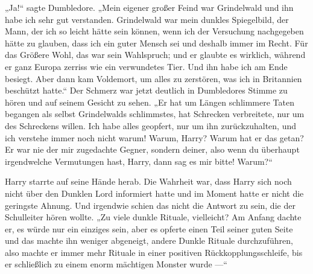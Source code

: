 „Ja!“ sagte Dumbledore.
„Mein eigener großer Feind war Grindelwald und ihn habe ich sehr gut verstanden. Grindelwald war mein dunkles Spiegelbild, der Mann, der ich so leicht hätte sein können, wenn ich der Versuchung nachgegeben hätte zu glauben, dass ich ein guter Mensch sei und deshalb immer im Recht. Für das Größere Wohl, das war sein Wahlspruch; und er glaubte es wirklich, während er ganz Europa zerriss wie ein verwundetes Tier. Und ihn habe ich am Ende besiegt. Aber dann kam Voldemort, um alles zu zerstören, was ich in Britannien beschützt hatte.“ Der Schmerz war jetzt deutlich in Dumbledores Stimme zu hören und auf seinem Gesicht zu sehen.
„Er hat um Längen schlimmere Taten begangen als selbst Grindelwalds schlimmstes, hat Schrecken verbreitete, nur um des Schreckens willen. Ich habe alles geopfert, nur um ihn zurückzuhalten, und ich verstehe immer noch nicht warum! Warum, Harry? Warum hat er das getan? Er war nie der mir zugedachte Gegner, sondern deiner, also wenn du überhaupt irgendwelche Vermutungen hast, Harry, dann sag es mir bitte! Warum?“

Harry starrte auf seine Hände herab. Die Wahrheit war, dass Harry sich noch nicht über den Dunklen Lord informiert hatte und im Moment hatte er nicht die geringste Ahnung. Und irgendwie schien das nicht die Antwort zu sein, die der Schulleiter hören wollte.
„Zu viele dunkle Rituale, vielleicht? Am Anfang dachte er, es würde nur ein einziges sein, aber es opferte einen Teil seiner guten Seite und das machte ihn weniger abgeneigt, andere Dunkle Rituale durchzuführen, also machte er immer mehr Rituale in einer positiven Rückkopplungsschleife, bis er schließlich zu einem enorm mächtigen Monster wurde —“

